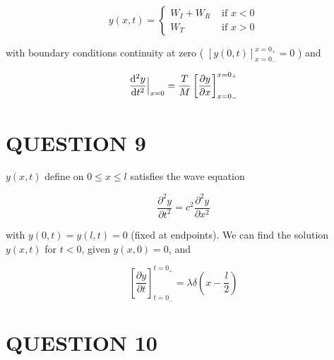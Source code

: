 \documentclass[a4paper]{article}
\begin{document}
\begin{enumerate}
	\[ y(x,t) = \begin{cases} W_{I} + W_{R}  & \text{ if } x < 0 \\ W_{T} & \text{ if } x > 0 \end{cases} \]
	
	with boundary conditions continuity at zero ( $ [ y(0,t) ]_{x = 0_{-}}^{x = 0_{+}} = 0 $ ) and 
	
	\[  \frac{\mathrm{d}^{2} y }{\mathrm{d} t^{2}} \Big|_{x=0} = \frac{T}{M} \left[  \frac{\partial y }{\partial x} \right]_{x = 0_{-}}^{x = 0_{+}} \]
	
	
	\end{enumerate}




\section{QUESTION 9}


$ y(x,t) $ define on $ 0 \leq x \leq l $ satisfies the wave equation

\[ \frac{\partial^{2}  y}{\partial t^{2} } = c^{2} \frac{\partial^{2} y }{\partial x^{2}} \]

with $ y(0,t) = y(l,t) = 0 $ (fixed at endpoints). We can find the solution $ y(x,t) $ for $ t < 0 $, given $ y(x,0) = 0 $, and 

\[ \left[  \frac{\partial y }{\partial t} \right]_{t = 0_{-}}^{t = 0_{+}} = \lambda \delta \left( x - \frac{l}{2} \right) \] 



\section{QUESTION 10}
\end{document}
